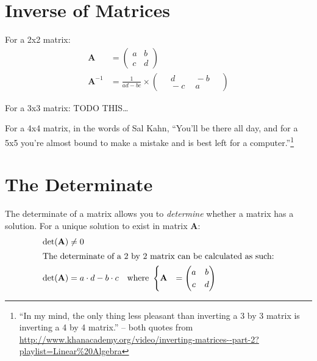 \section{Inverse of Matrices}
\label{sec:InverseOfMatrices}
For a 2x2 matrix:
\begin{align}
  \mathbf{A} & = 
    \begin{pmatrix}
      a & b \\
      c & d
    \end{pmatrix}
    \\
  \mathbf{A}^{-1} & =
    \frac{1}{ad-bc} \times
    \begin{pmatrix}
      &~d~&~-b~& \\
      &~-c~&~a~&
    \end{pmatrix}  
\end{align}

For a 3x3 matrix:
%
TODO THIS\ldots

For a 4x4 matrix, in the words of Sal Kahn, ``You'll be there all day, and for a
5x5 you're almost bound to make a mistake and is best left for a
computer.''\footnote{``In my mind, the only thing less pleasant than inverting
a 3 by 3 matrix is inverting a 4 by 4 matrix.'' -- both quotes from \url{
http://www.khanacademy.org/video/inverting-matrices--part-2?playlist=Linear\%20Algebra} }
\section{The Determinate}
\label{sec:MatrixDeterminate}
The determinate of a matrix allows you to \emph{determine} whether a matrix has
a solution. For a unique solution to exist in matrix $\mathbf{A}$:
\begin{align}
  \det(\mathbf{A}) & \neq 0 \\
  \intertext{The determinate of a $2$ by $2$ matrix can be calculated as such:}
  \det(\mathbf{A}) & = a \cdot d - b \cdot c
  \quad \text{where} ~
  \begin{cases} 
  \mathbf{A} & = 
    \begin{pmatrix}
      a & b \\
      c & d
    \end{pmatrix}
  \end{cases}
\end{align}


